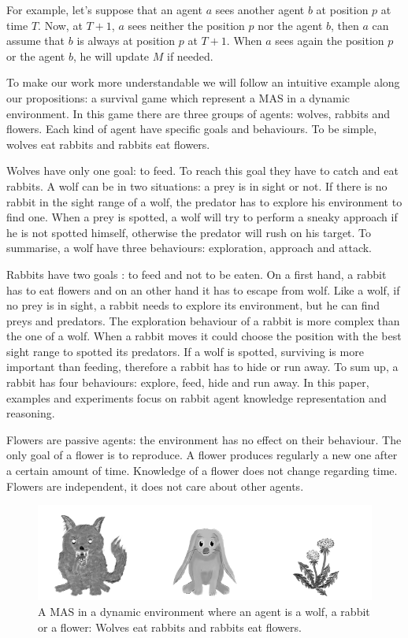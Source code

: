 \documentclass{aamas2012}
\begin{document}
	For example, let's suppose that an agent $a$ sees another agent $b$ at position $p$ at time $T$.
	Now, at $T+1$, $a$ sees neither the position $p$ nor the agent $b$, then $a$ can assume that $b$ is always at position $p$ at $T+1$.
	When $a$ sees again the position $p$ or the agent $b$, he will update $M$ if needed.
	
	To make our work more understandable we will follow an intuitive example along our propositions: a survival game which represent a MAS in a dynamic environment.
	In this game there are three groups of agents: wolves, rabbits and flowers.
	Each kind of agent have specific goals and behaviours.
	To be simple, wolves eat rabbits and rabbits eat flowers.
	
	Wolves have only one goal: to feed.
	To reach this goal they have to catch and eat rabbits.
	A wolf can be in two situations: a prey is in sight or not.
	If there is no rabbit in the sight range of a wolf, the predator has to explore his environment to find one.
	When a prey is spotted, a wolf will try to perform a sneaky approach if he is not spotted himself, otherwise the predator will rush on his target.
	To summarise, a wolf have three behaviours: exploration, approach and attack.
	
	Rabbits have two goals : to feed and not to be eaten.
	On a first hand, a rabbit has to eat flowers and on an other hand it has to escape from wolf.
	Like a wolf, if no prey is in sight, a rabbit needs to explore its environment, but he can find preys and predators.
	The exploration behaviour of a rabbit is more complex than the one of a wolf.
	When a rabbit moves it could choose the position with the best sight range to spotted its predators.
	If a wolf is spotted, surviving is more important than feeding, therefore a rabbit has to hide or run away.
	To sum up, a rabbit has four behaviours: explore, feed, hide and run away.
	In this paper, examples and experiments focus on rabbit agent knowledge representation and reasoning.
	
	Flowers are passive agents: the environment has no effect on their behaviour.
	The only goal of a flower is to reproduce.
	A flower produces regularly a new one after a certain amount of time.
	Knowledge of a flower does not change regarding time.
	Flowers are independent, it does not care about other agents.

	\begin{figure}
		\centering
		\includegraphics[keepaspectratio=true,scale=3.0]{food_chain.png}
		\caption
		{
			\label{food_chain}
			A MAS in a dynamic environment where an agent is a wolf, a rabbit or a flower:
			Wolves eat rabbits and rabbits eat flowers.
		}
	\end{figure}
	
\end{document}
